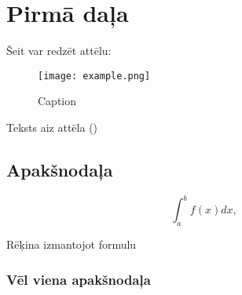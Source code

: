 \section{Pirmā daļa}


Šeit var redzēt attēlu:

\begin{figure}[H]
    \centering
    \texttt{[image: example.png]}
    \caption{Caption}
    \label{fig:imagename}
\end{figure}

Teksts aiz attēla ()


\subsection{Apakšnodaļa}

\begin{equation}
    \label{eqn:Equation label}
    \int_a^b f(x)dx,
\end{equation}

Rēķina izmantojot formulu 

\subsubsection{Vēl viena apakšnodaļa}


\newpage